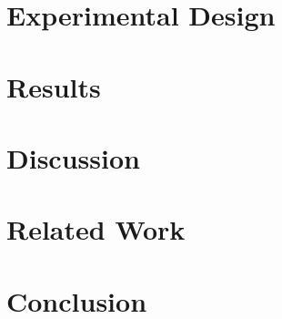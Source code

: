 \documentclass[11pt,twocolumn]{article}
\begin{document}
\section{Experimental Design}


\section{Results}


\section{Discussion}


\section{Related Work}


\section{Conclusion}




\end{document}
